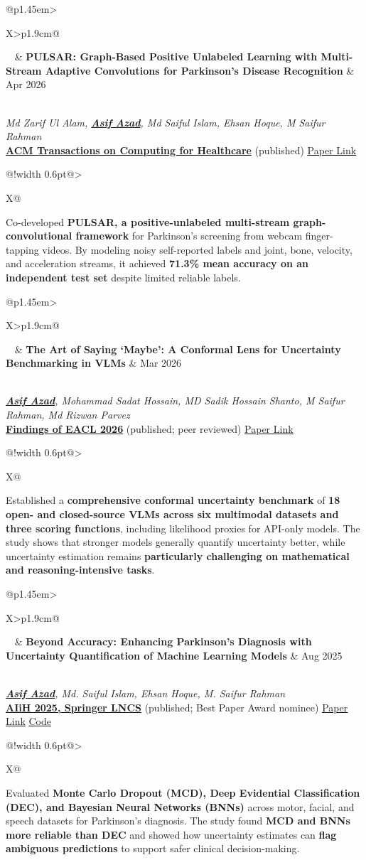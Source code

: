 \documentclass[10pt,letterpaper]{article}
\makeatletter
\newenvironment{entry}
    {\begin{minipage}{\linewidth}\color{textColor}}
    {\end{minipage}}
\newcommand{\selectedpublication}[6]{%
    \begin{entry}
        \begin{tabularx}{\linewidth}{@{}p{1.45em}>{\raggedright\arraybackslash}X>{\raggedleft\arraybackslash}p{1.9cm}@{}}
            {\setlength{\fboxsep}{1.4pt}\colorbox{primaryColor}{\textcolor{white}{\bfseries\scriptsize #1}}}
            & \textbf{#2}
            & \textcolor{mutedColor}{#3}
        \end{tabularx}\\[0.20em]
        #4\\[0.18em]
        #5\\[0.30em]
        \begin{tabularx}{\linewidth}{@{\hspace{1.45em}}!{\color{mutedColor}\vrule width 0.6pt}@{\hspace{0.62em}}>{\raggedright\arraybackslash}X@{}}
            \textcolor{textColor}{#6}
        \end{tabularx}
    \end{entry}
    \vspace{0.78em}
}
\makeatother
\begin{document}
\selectedpublication
    {4}
    {PULSAR: Graph-Based Positive Unlabeled Learning with Multi-Stream Adaptive Convolutions for Parkinson's Disease Recognition}
    {Apr 2026}
    {\textit{Md Zarif Ul Alam, \textbf{\underline{Asif Azad}}, Md Saiful Islam, Ehsan Hoque, M Saifur Rahman}}
    {\href{https://dl.acm.org/doi/10.1145/3799417}{\textbf{ACM Transactions on Computing for Healthcare}} (published) \enspace\textbar\enspace \href{https://dl.acm.org/doi/10.1145/3799417}{\underline{Paper Link}}}
    {Co-developed \textbf{PULSAR, a positive-unlabeled multi-stream graph-convolutional framework} for Parkinson's screening from webcam finger-tapping videos. By modeling noisy self-reported labels and joint, bone, velocity, and acceleration streams, it achieved \textbf{71.3\% mean accuracy on an independent test set} despite limited reliable labels.}

\selectedpublication
    {5}
    {The Art of Saying ‘Maybe’: A Conformal Lens for Uncertainty Benchmarking in VLMs}
    {Mar 2026}
    {\textit{\textbf{\underline{Asif Azad}}, Mohammad Sadat Hossain, MD Sadik Hossain Shanto, M Saifur Rahman, Md Rizwan Parvez}}
    {\href{https://aclanthology.org/2026.findings-eacl.274/}{\textbf{Findings of EACL 2026}} (published; peer reviewed) \enspace\textbar\enspace \href{https://aclanthology.org/2026.findings-eacl.274/}{\underline{Paper Link}}}
    {Established a \textbf{comprehensive conformal uncertainty benchmark} of \textbf{18 open- and closed-source VLMs across six multimodal datasets and three scoring functions}, including likelihood proxies for API-only models. The study shows that stronger models generally quantify uncertainty better, while uncertainty estimation remains \textbf{particularly challenging on mathematical and reasoning-intensive tasks}.}

\selectedpublication
    {6}
    {Beyond Accuracy: Enhancing Parkinson's Diagnosis with Uncertainty Quantification of Machine Learning Models}
    {Aug 2025}
    {\textit{\textbf{\underline{Asif Azad}}, Md. Saiful Islam, Ehsan Hoque, M. Saifur Rahman}}
    {\href{https://link.springer.com/chapter/10.1007/978-3-032-00652-3_3}{\textbf{AIiH 2025, Springer LNCS}} (published; Best Paper Award nominee) \enspace\textbar\enspace \href{https://link.springer.com/chapter/10.1007/978-3-032-00652-3_3}{\underline{Paper Link}} \enspace\textbar\enspace \href{https://github.com/BRAINIAC2677/UQ4PD-ML}{\underline{Code}}}
    {Evaluated \textbf{Monte Carlo Dropout (MCD), Deep Evidential Classification (DEC), and Bayesian Neural Networks (BNNs)} across motor, facial, and speech datasets for Parkinson's diagnosis. The study found \textbf{MCD and BNNs more reliable than DEC} and showed how uncertainty estimates can \textbf{flag ambiguous predictions} to support safer clinical decision-making.}
\end{document}

